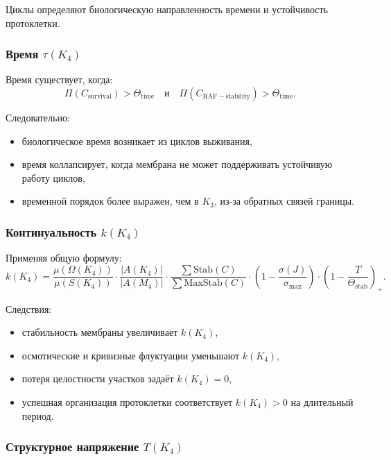 Циклы определяют биологическую направленность времени и устойчивость
протоклетки.

\subsubsection{Время \texorpdfstring{$\tau(K_4)$}{\tau(K_4)}}

Время существует, когда:
\[
\Pi(C_{\mathrm{survival}}) > \Theta_{\mathrm{time}}
\quad\text{и}\quad
\Pi(C_{\mathrm{RAF-stability}}) > \Theta_{\mathrm{time}}.
\]

Следовательно:
\begin{itemize}
    \item биологическое время возникает из циклов выживания,
    \item время коллапсирует, когда мембрана не может поддерживать
          устойчивую работу циклов,
    \item временной порядок более выражен, чем в $K_3$, из-за обратных связей
          границы.
\end{itemize}

\subsubsection{Континуальность \texorpdfstring{$k(K_4)$}{k(K_4)}}

Применяя общую формулу:
\[
k(K_4) =
\frac{\mu(\Omega(K_4))}{\mu(S(K_4))}
\cdot
\frac{|A(K_4)|}{|A(M_4)|}
\cdot
\frac{\sum \mathrm{Stab}(C)}{\sum \mathrm{MaxStab}(C)}
\cdot
(1 - \frac{\sigma(J)}{\sigma_{\max}})
\cdot
(1 - \frac{T}{\Theta_{\mathrm{stab}}})_+.
\]

Следствия:
\begin{itemize}
    \item стабильность мембраны увеличивает $k(K_4)$,
    \item осмотические и кривизные флуктуации уменьшают $k(K_4)$,
    \item потеря целостности участков задаёт $k(K_4)=0$,
    \item успешная организация протоклетки соответствует
          $k(K_4)>0$ на длительный период.
\end{itemize}

\subsubsection{Структурное напряжение \texorpdfstring{$T(K_4)$}{T(K_4)}}

